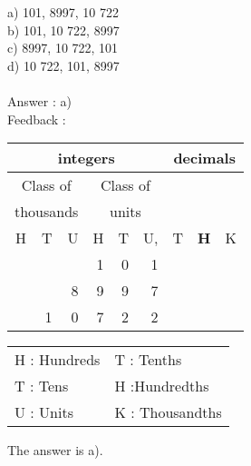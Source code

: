 \documentclass[letterpaper, 12pt]{article}
\begin{document}
a) 101, 8997, 10 722\\
b) 101, 10 722, 8997\\
c) 8997, 10 722, 101\\
d) 10 722, 101, 8997\\\\

Answer : a)\\

Feedback :\\
\begin{center}
\begin{tabular}{|rrr|rrr|rrr|}
\hline
\multicolumn{6}{|c|}{integers} &\multicolumn{3}{|c|}{decimals} \\
\hline
\multicolumn{3}{|c|}{Class of} &\multicolumn{3}{|c|}{Class of} &  \multicolumn{3}{c|}{} \\
\multicolumn{3}{|c|}{thousands} &\multicolumn{3}{|c|}{units} &  \multicolumn{3}{c|}{} \\
\hline
H & T & U &H & T & U, & T\up{th} & \textbf{H\up{th}} & K\up{th} \\
\hline
\hline
 &  &  & 1 & 0 & 1 &  &  & \\
 &  & 8 & 9 & 9 & 7 &  &  &\\
 & 1 & 0 & 7 & 2 & 2 &  &  &\\
\hline
\end{tabular}
\end{center}

\scriptsize
\begin{center}
\begin{tabular}{ll}
H : Hundreds & T\up{th} : Tenths\\
T : Tens & H\up{th} :Hundredths\\
U : Units & K\up{e} : Thousandths\\
\end{tabular}
\end{center}

\normalsize

The answer is a).\\
\end{document}
